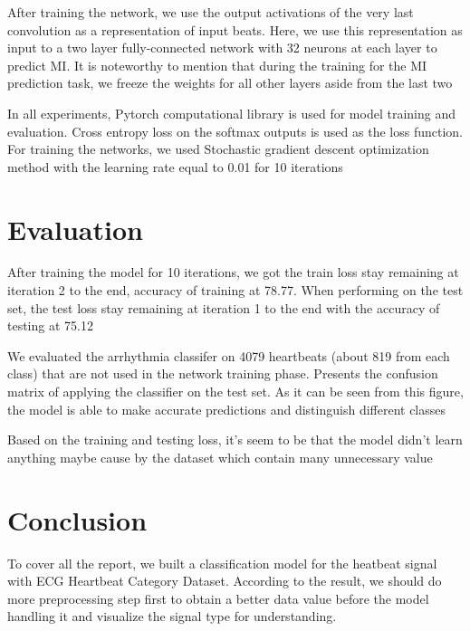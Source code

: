 \documentclass[twocolumn]{article}
\begin{document}
After training the network, we use the output activations of the very last convolution as a representation of input beats. Here, we use this representation as input to a two layer fully-connected network with 32 neurons at each layer to predict MI. It is noteworthy to mention that during the training for the MI prediction task, we freeze the weights for all other layers aside from the last two

In all experiments, Pytorch computational library is used for model training and evaluation. Cross entropy loss on the softmax outputs is used as the loss function. For training the networks, we used Stochastic gradient descent optimization method with the learning rate equal to 0.01 for 10 iterations

\section{Evaluation}
After training the model for 10 iterations, we got the train loss stay remaining at iteration 2 to the end, accuracy of training at 78.77. When performing on the test set, the test loss stay remaining at iteration 1 to the end with the accuracy of testing at 75.12

We evaluated the arrhythmia classifer on 4079 heartbeats (about 819 from each class) that are not used in the network training phase. Presents the confusion matrix of applying the classifier on the test set. As it can be seen from this figure, the model is able to make accurate predictions and distinguish different classes

Based on the training and testing loss, it's seem to be that the model didn't learn anything maybe cause by the dataset which contain many unnecessary value
\section{Conclusion}
To cover all the report, we built a classification model for the heatbeat signal with ECG Heartbeat Category Dataset. According to the result, we should do more preprocessing step first to obtain a better data value before the model handling it and visualize the signal type for understanding.
\end{document}
